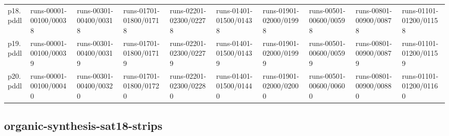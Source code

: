 \documentclass{article}
\begin{document}
\begin{tabular}{@{}lrrrrrrrrr@{}}
p18.pddl & \multicolumn{1}{|l|}{runs-00001-00100/00038} & \multicolumn{1}{|l|}{runs-00301-00400/00318} & \multicolumn{1}{|l|}{runs-01701-01800/01718} & \multicolumn{1}{|l|}{runs-02201-02300/02278} & \multicolumn{1}{|l|}{runs-01401-01500/01438} & \multicolumn{1}{|l|}{runs-01901-02000/01998} & \multicolumn{1}{|l|}{runs-00501-00600/00598} & \multicolumn{1}{|l|}{runs-00801-00900/00878} & \multicolumn{1}{|l|}{runs-01101-01200/01158} \\
p19.pddl & \multicolumn{1}{|l|}{runs-00001-00100/00039} & \multicolumn{1}{|l|}{runs-00301-00400/00319} & \multicolumn{1}{|l|}{runs-01701-01800/01719} & \multicolumn{1}{|l|}{runs-02201-02300/02279} & \multicolumn{1}{|l|}{runs-01401-01500/01439} & \multicolumn{1}{|l|}{runs-01901-02000/01999} & \multicolumn{1}{|l|}{runs-00501-00600/00599} & \multicolumn{1}{|l|}{runs-00801-00900/00879} & \multicolumn{1}{|l|}{runs-01101-01200/01159} \\
p20.pddl & \multicolumn{1}{|l|}{runs-00001-00100/00040} & \multicolumn{1}{|l|}{runs-00301-00400/00320} & \multicolumn{1}{|l|}{runs-01701-01800/01720} & \multicolumn{1}{|l|}{runs-02201-02300/02280} & \multicolumn{1}{|l|}{runs-01401-01500/01440} & \multicolumn{1}{|l|}{runs-01901-02000/02000} & \multicolumn{1}{|l|}{runs-00501-00600/00600} & \multicolumn{1}{|l|}{runs-00801-00900/00880} & \multicolumn{1}{|l|}{runs-01101-01200/01160} \\
\end{tabular}

\hypertarget{run_dir-organic-synthesis-sat18-strips}{}
\subsection*{organic-synthesis-sat18-strips}
\end{document}
